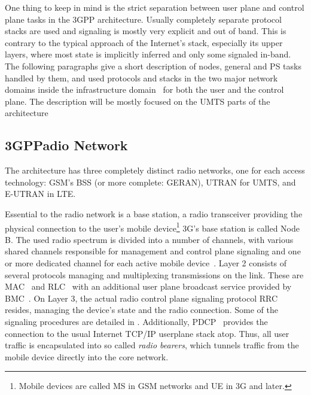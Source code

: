 One thing to keep in mind is the strict separation between user plane and control plane tasks in the \gls{3GPP} architecture. Usually completely separate protocol stacks are used and signaling is mostly very explicit and out of band. This is contrary to the typical approach of the Internet's stack, especially its upper layers, where most state is implicitly inferred and only some signaled in-band. The following paragraphs give a short description of nodes, general and \gls{PS} tasks handled by them, and used protocols and stacks in the two major network domains inside the infrastructure domain~\cite{3gpp.23.101} for both the user and the control plane. The description will be mostly focused on the \gls{UMTS} parts of the architecture


\subsection{\texorpdfstring{\acrshort{3GPP}} Radio Network}

The architecture has three completely distinct radio networks, one for each access technology: \gls{GSM}'s \gls{BSS} (or more complete: \gls{GERAN}), \gls{UTRAN} for \gls{UMTS}, and \gls{E-UTRAN} in \gls{LTE}.

Essential to the radio network is a base station, a radio transceiver providing the physical connection to the user's mobile device\footnote{Mobile devices are called \gls{MS} in \gls{GSM} networks and \gls{UE} in 3G and later.} 3G's base station is called Node B. The used radio spectrum is divided into a number of channels, with various shared channels responsible for management and control plane signaling and one or more dedicated channel for each active mobile device~\cite{3gpp.25.201,3gpp.25.301}. Layer 2 consists of several protocols managing and multiplexing transmissions on the link. These are \gls{MAC}~\cite{3gpp.25.321} and \gls{RLC}~\cite{3gpp.25.322} with an additional user plane broadcast service provided by \gls{BMC}~\cite{3gpp.25.324}. On Layer 3, the actual radio control plane signaling protocol \gls{RRC}~\cite{3gpp.25.331} resides, managing the device's state and the radio connection. Some of the signaling procedures are detailed in \cite{3gpp.25.931}. Additionally, \gls{PDCP}~\cite{3gpp.25.323} provides the connection to the  usual Internet TCP/IP userplane stack atop. Thus, all user traffic is encapsulated into so called \textit{radio bearers}, which tunnels traffic from the mobile device directly into the core network.

